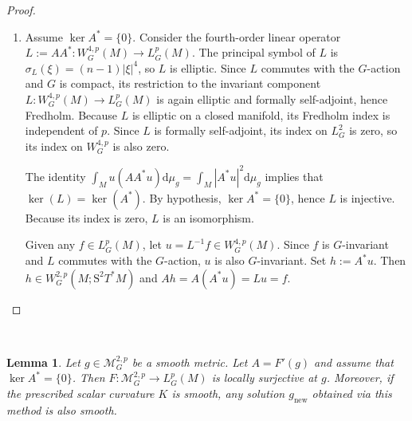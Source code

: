 \documentclass[12pt,a4paper]{amsart}
\theoremstyle{plain}
\newtheorem{lemma}[theorem]{Lemma}
\theoremstyle{definition}
\theoremstyle{remark}
\newcommand{\ga}{\mathit{g}} %
\begin{document}
\begin{proof}
\begin{enumerate}[label=\textup{(\alph*)}, font=\upshape]
\begin{itemize}
        \end{itemize}
         In both cases, $F(\ga)$ must be a constant. Multiplying the (Trace Eq) by $u$ and integrating over $M$ yields:$$\int_M |\mathrm{d} u|^2 \,\mathrm{d}\mu_{\ga} = \frac{F(\ga)}{n-1} \int_M u^2 \,\mathrm{d}\mu_{\ga}\implies F(\ga) \geq 0.$$ Since $F(\ga)$ is constant and non-negative, but assumed not to be a positive constant, we must have $F(\ga) = 0$.
         
         Substituting $F(\ga) = 0$ back into the (Trace Eq) implies $\Delta_{\ga} u = 0$. Since $M$ is compact, the harmonic function $u$ must be a constant $c \neq 0$. Finally, substituting $u = c$ and $\nabla^2 u = 0$ into $A^*u = 0$ leaves $-c\,\mathrm{Ric}(\ga) = 0$, which implies $\mathrm{Ric}(\ga) = 0$.
        \item Assume $\ker A^* = \{0\}$. Consider the fourth-order linear operator $L := AA^* : W_G^{4,p}(M) \to L_G^p(M)$. The principal symbol of $L$ is $\sigma_L(\xi) = (n-1)|\xi|^4$, so $L$ is elliptic. Since $L$ commutes with the $G$-action and $G$ is compact, its restriction to the invariant component $L \colon W_G^{4,p}(M) \to L_G^p(M)$ is again elliptic and formally self-adjoint, hence Fredholm. Because $L$ is elliptic on a closed manifold, its Fredholm index is independent of $p$. Since $L$ is formally self-adjoint, its index on $L^2_G$ is zero, so its index on $W_G^{4,p}$ is also zero.
    
     The identity $\int_M u (AA^* u) \mathrm{d}\mu_{\ga} = \int_M |A^* u|^2 \mathrm{d}\mu_{\ga}$ implies that $\ker(L) = \ker(A^*)$. By hypothesis, $\ker A^* = \{0\}$, hence $L$ is injective. Because its index is zero, $L$ is an isomorphism.
    
    Given any $f \in L_G^p(M)$, let $u = L^{-1} f \in W_G^{4,p}(M)$. Since $f$ is $G$-invariant and $L$ commutes with the $G$-action, $u$ is also $G$-invariant. Set $h := A^* u$. Then $h \in W_G^{2,p}(M; \mathrm{S}^2T^{\ast}M)$ and $Ah = A(A^* u) = L u = f.$
    \end{enumerate}
\end{proof}

\ 

\begin{lemma}\label{lem:inversefunction}
Let $\ga \in \mathcal{M}_G^{2,p}$ be a smooth metric. Let $A = F'(\ga)$ and assume that $\ker A^* = \{0\}$. Then $F : \mathcal{M}_G^{2,p} \to L^p_G(M)$ is locally surjective at $\ga$. Moreover, if the prescribed scalar curvature $K$ is smooth, any solution $\ga_{\mathrm{new}}$ obtained via this method is also smooth.
\end{lemma}
\end{document}
